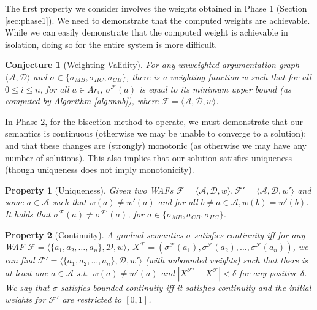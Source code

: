\documentclass{article}
\newcommand{\AF}{\mathcal{F}}
\newcommand{\A}{\mathcal{A}}
\newcommand{\D}{\mathcal{D}}
\newtheorem{property}{Property}
\newtheorem{conjecture}{Conjecture}
\begin{document}
The first property we consider involves the weights obtained in Phase 1 (Section \ref{sec:phase1}). We need to demonstrate that the computed weights are achievable. While we can easily demonstrate that the computed weight is achievable in isolation, doing so for the entire system is more difficult.

\begin{conjecture}[Weighting Validity]
\label{weight-existence}
For any unweighted argumentation graph $\langle \A, \D \rangle$ and $\sigma \in \{ \sigma_{MB}, \sigma_{HC} , \sigma_{CB} \}$, there is a
weighting function $w$ such that for all $0 \leq i \leq n$, for all $a \in Ar_i$, $\sigma^\AF(a)$ is equal to its minimum upper bound (as computed by Algorithm \ref{alg:mub}), where $\AF = \langle \A , \D, w \rangle$.
\end{conjecture}

In Phase 2, for the bisection method to operate, we must demonstrate that our semantics is continuous  (otherwise we may be unable to converge to a solution); and that these changes are (strongly) monotonic (as otherwise we may have any number of solutions). This also implies that our solution satisfies uniqueness (though uniqueness does not imply monotonicity).

\begin{property}[Uniqueness]
\label{prop:uniqueness}
Given two WAFs $\AF=\langle \A, \D, w \rangle, \AF'=\langle \A, \D,w'\rangle$ and some $a \in \A$ such that $w(a)\neq w'(a)$ and for all $ b \neq a \in \A, w(b)=w'(b)$. It holds that $\sigma^\AF(a) \neq \sigma^{\AF'}(a)$, for $\sigma \in \{\sigma_{MB},\sigma_{CB},\sigma_{HC}\}$.
\end{property}

\begin{property}[Continuity]

A gradual semantics $\sigma$ satisfies continuity iff for any WAF $\AF = \langle \{ a_1, a_2, \dots, a_n\},\D,w\rangle$, $X^\AF = (\sigma^\AF(a_1), \sigma^\AF(a_2), \dots, \sigma^\AF(a_n))$, we can find $\AF' = \langle \{ a_1, a_2, \dots, a_n\},\D,w'\rangle$ (with unbounded weights) such that there is at least one $a \in \A$ s.t.~$w(a) \neq w'(a)$ and  $|X^{\AF'}-X^{\AF}|<\delta$ for any positive $\delta$.
%
We say that $\sigma$ satisfies bounded continuity iff it satisfies continuity and the initial weights for $\AF'$ are restricted to $[0,1]$.
\end{property}
\end{document}
